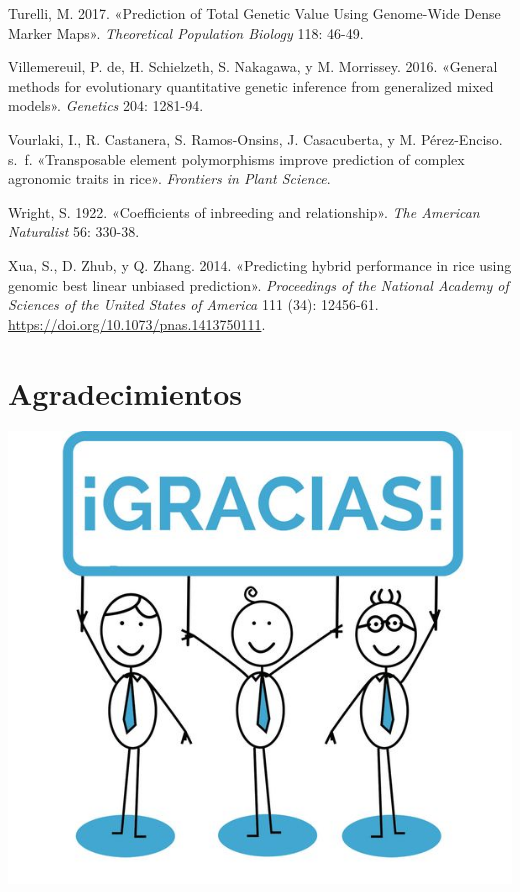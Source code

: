 \documentclass[11pt,spanish,a4paper,oneside,]{book} %
\begin{document}
\leavevmode\hypertarget{ref-cite:9}{}%
Turelli, M. 2017. «Prediction of Total Genetic Value Using Genome-Wide Dense Marker Maps». \emph{Theoretical Population Biology} 118: 46-49.

\leavevmode\hypertarget{ref-cite:4}{}%
Villemereuil, P. de, H. Schielzeth, S. Nakagawa, y M. Morrissey. 2016. «General methods for evolutionary quantitative genetic inference from generalized mixed models». \emph{Genetics} 204: 1281-94.

\leavevmode\hypertarget{ref-cite:26}{}%
Vourlaki, I., R. Castanera, S. Ramos-Onsins, J. Casacuberta, y M. Pérez-Enciso. s.~f. «Transposable element polymorphisms improve prediction of complex agronomic traits in rice». \emph{Frontiers in Plant Science}.

\leavevmode\hypertarget{ref-cite:12}{}%
Wright, S. 1922. «Coefficients of inbreeding and relationship». \emph{The American Naturalist} 56: 330-38.

\leavevmode\hypertarget{ref-cite:25}{}%
Xua, S., D. Zhub, y Q. Zhang. 2014. «Predicting hybrid performance in rice using genomic best linear unbiased prediction». \emph{Proceedings of the National Academy of Sciences of the United States of America} 111 (34): 12456-61. \url{https://doi.org/10.1073/pnas.1413750111}.

\endgroup

\hypertarget{agradecimientos}{%
\chapter*{Agradecimientos}\label{agradecimientos}}


\includegraphics{figures/uvalogo_regular_p_en.pdf}

\backmatter
\end{document}
